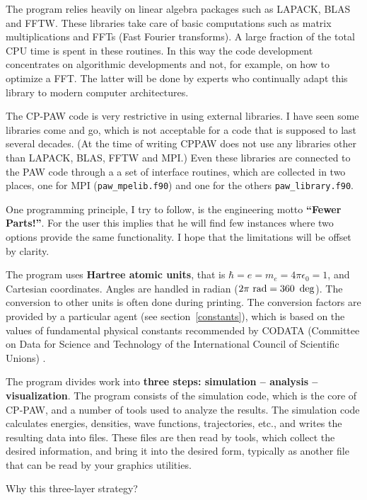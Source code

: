 \documentclass[final,12pt]{article}
\begin{document}
The program relies heavily on linear algebra packages such as LAPACK,
BLAS and FFTW. These libraries take care of basic computations such
as matrix multiplications and FFTs (Fast Fourier transforms). A large
fraction of the total CPU time is spent in these routines. In this way
the code development concentrates on algorithmic developments and not,
for example, on how to optimize a FFT.  The latter will be done by
experts who continually adapt this library to modern computer
architectures.

The CP-PAW code is very restrictive in using external libraries. I
have seen some libraries come and go, which is not acceptable for a
code that is supposed to last several decades. (At the time of writing
CPPAW does not use any libraries other than LAPACK, BLAS, FFTW and
MPI.) Even these libraries are connected to the PAW code through a a
set of interface routines, which are collected in two places, one for MPI (\verb|paw_mpelib.f90|) and one for the others \verb|paw_library.f90|. 

One programming principle, I try to follow, is the engineering
motto {\bf ``Fewer Parts!''}. For the user this implies that he will
find few instances where two options provide the same functionality. I
hope that the limitations will be offset by clarity.

The program uses \textbf{Hartree atomic units}, that is $\hbar=e=m_e=4\pi\epsilon_0=1$, and Cartesian
coordinates.  Angles are handled in radian ($2\pi{\rm\ rad}=
360~\deg$).  The conversion to other units is often done during
printing. The conversion factors are provided by a particular agent
(see section~\ref{constants}), which is based on the values of
fundamental physical constants recommended by CODATA
(Committee on Data for Science and Technology of the International
Council of Scientific Unions) \cite{mohr00_rmp72_351}.

The program divides work into {\bf three steps: simulation --
  analysis -- visualization}.  The program consists of the simulation
code, which is the core of CP-PAW, and a number of tools used to
analyze the results.  The simulation code calculates energies,
densities, wave functions, trajectories, etc., and writes the
resulting data into files.  These files are then read by tools, which
collect the desired information, and bring it into the desired
form, typically as another file that can be read by your graphics
utilities.

Why this three-layer strategy?
\end{document}
